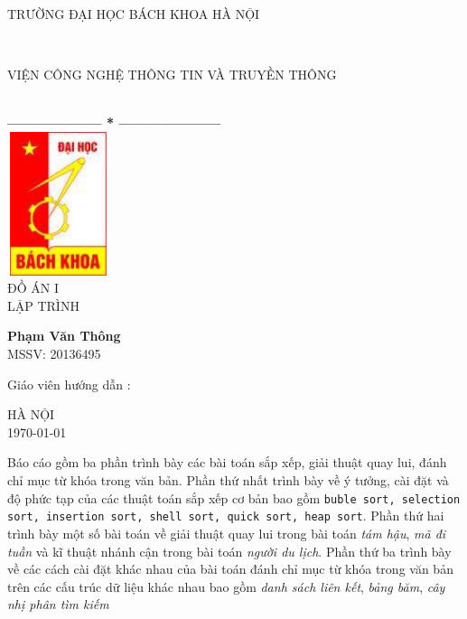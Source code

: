 \documentclass[a4paper,12pt]{report}
\begin{document}
\thispagestyle{empty}
\thisfancypage{
\setlength{\fboxsep}{0pt}
\fbox}{} 
\begin{center}
    \begin{large}
        \textcolor[rgb]{1.00,0.00,0.00}{TRƯỜNG ĐẠI HỌC BÁCH KHOA HÀ NỘI}
    \end{large} \\
    \begin{large}
        \textcolor[rgb]{1.00,0.00,0.00}{VIỆN CÔNG NGHỆ THÔNG TIN VÀ TRUYỀN THÔNG}
    \end{large} \\

    \textbf{--------------------  *  ---------------------}\\[2cm]

    \includegraphics[width=3cm, height=4.2cm]{img/logo.jpg}\\[1cm]
    {\fontsize{32pt}{1}\selectfont ĐỒ ÁN I}\\
    {\fontsize{20pt}{1}\selectfont LẬP TRÌNH}\\[2cm]
\end{center}


\begin{flushright}
    \parbox[t]{10cm}{
    \textbf{Phạm Văn Thông}\\MSSV: 20136495\\}
\end{flushright}

\hspace{5cm} Giáo viên hướng dẫn\hspace{24pt} :
\begin{flushright} \textbf{\parbox[t]{8cm}{    
        \textcolor[rgb]{0.00,0.00,1.00}{Phạm Đăng Hải}
        }}
\end{flushright}
    \vspace{2cm}
\begin{center}
        {\fontsize{16pt}{1}\selectfont HÀ NỘI}\\
        {\fontsize{16pt}{1}\today}
\end{center}

\newpage
\abstract
Báo cáo gồm ba phần trình bày các bài toán sắp xếp, giải thuật quay lui, đánh chỉ mục từ khóa trong văn bản. 
Phần thứ nhất trình bày về ý tưởng, cài đặt và độ phức tạp của các thuật toán sắp xếp cơ bản bao gồm \texttt{buble sort, selection sort, insertion sort, shell sort, quick sort, heap sort}. Phần thứ hai trình bày một số bài toán về giải thuật quay lui trong bài toán \emph{tám hậu}, \emph{mã đi tuần} và kĩ thuật nhánh cận trong bài toán \emph{người du lịch}. Phần thứ ba trình bày về các cách cài đặt khác nhau của bài toán đánh chỉ mục từ khóa trong văn bản trên các cấu trúc dữ liệu khác nhau bao gồm \emph{danh sách liên kết}, \emph{bảng băm}, \emph{cây nhị phân tìm kiếm}
\end{document}
